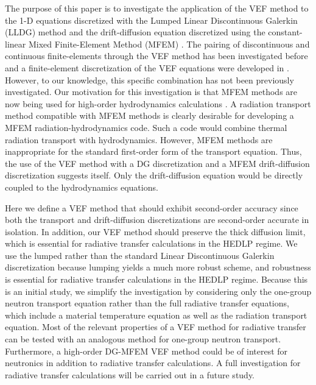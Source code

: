 The purpose of this paper is to investigate the application of the VEF method to the 1-D \SN equations 
discretized with the Lumped Linear Discontinuous Galerkin (LLDG) method and the drift-diffusion equation discretized using the 
constant-linear Mixed Finite-Element Method (MFEM) \cite{Raviart1977}. The pairing of discontinuous and continuous finite-elements through the VEF method has been investigated before \cite{wieselquist,anistratov} and a finite-element discretization of the VEF equations were developed in \cite{hybrid}. However, to our knowledge, this specific combination has not been previously 
investigated. Our motivation for this investigation is that MFEM methods are now being used for high-order hydrodynamics 
calculations \cite{blast}.  A radiation transport method compatible with MFEM 
methods is clearly desirable for developing a MFEM radiation-hydrodynamics code.  Such a code would combine thermal 
radiation transport with hydrodynamics.  However, MFEM methods are inappropriate for the standard first-order form of the 
transport equation.  Thus, the use of the VEF method with a DG \SN discretization and a MFEM drift-diffusion discretization 
suggests itself.  Only the drift-diffusion equation would be directly coupled to the hydrodynamics equations.

Here we define a VEF method that should exhibit second-order accuracy since both the transport and drift-diffusion 
discretizations are second-order accurate in isolation.  In addition, our VEF method should preserve the thick diffusion 
limit, which is essential for radiative transfer calculations in the HEDLP regime. We use the lumped 
rather than the standard Linear Discontinuous Galerkin discretization because lumping yields a much more robust scheme, and 
robustness is essential 
for radiative transfer calculations in the HEDLP regime.   Because this is an initial study, we simplify the investigation 
by considering only the one-group neutron transport equation rather than the full radiative transfer equations, which include a 
material temperature equation as well as the radiation transport equation.  Most of the relevant properties of  
a VEF method for radiative transfer can be tested with an analogous method for one-group neutron transport.  Furthermore, 
a high-order DG-MFEM VEF method could be of interest for neutronics in addition to radiative transfer calculations. 
A full investigation for radiative transfer calculations will be carried out in a future study. 

